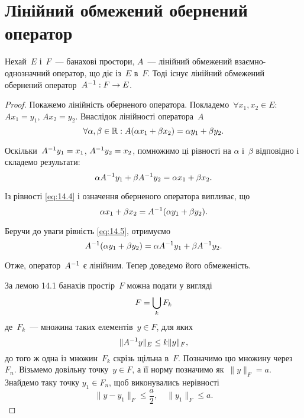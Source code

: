 \section{Лінійний обмежений обернений оператор}

\begin{theorem}
Нехай~$E$ і~$F$~--- банахові простори,
$A$~--- лінійний обмежений взаємно-однозначний оператор,
що діє із~$E$ в~$F$.
Тоді існує лінійний обмежений обернений
оператор~$A^{-1}: F \to E$.
\end{theorem}

\begin{proof}
Покажемо лінійність оберненого оператора.
Покладемо~$\forall x_1, x_2 \in E$: $A x_1 = y_1$, $A x_2 = y_2$.
Внаслідок лінійності оператора~$A$
\begin{equation}
    \label{eq:14.4}
    \forall \alpha, \beta \in \mathbb{R}:
    A(\alpha x_1 + \beta x_2) =
    \alpha y_1 + \beta y_2.
\end{equation}

Оскільки~$A^{-1} y_1 = x_1$, $A^{-1} y_2 = x_2$, помножимо ці рівності на
$\alpha$ і~$\beta$ відповідно і складемо результати:
\begin{equation}
    \label{eq:14.5}
    \alpha A^{-1} y_1 + \beta A^{-1} y_2 =
    \alpha x_1 + \beta x_2.
\end{equation}

Із рівності \eqref{eq:14.4} і означення оберненого оператора випливає, що
\begin{equation*}
    \alpha x_1 + \beta x_2 = A^{-1} (\alpha y_1 + \beta y_2).
\end{equation*}

Беручи до уваги рівність \eqref{eq:14.5}, отримуємо
\begin{equation*}
    A^{-1} (\alpha y_1 + \beta y_2) = \alpha A^{-1} y_1 + \beta A^{-1} y_2.
\end{equation*}

Отже, оператор~$A^{-1}$ є лінійним. Тепер доведемо його обмеженість.

За \error лемою 14.1 банахів простір~$F$ можна подати у вигляді
\begin{equation*}
    F = \operatorname*{\bigcup}_k F_k
\end{equation*}
де~$F_k$~--- множина таких елементів~$y \in F$, для яких
\begin{equation*}
    \|A^{-1} y\|_E \le k \|y\|_F,
\end{equation*}
до того ж одна із множин~$F_k$ скрізь щільна в~$F$. Позначимо
цю множину через~$F_n$. Візьмемо довільну точку~$y \in F$, а її
норму позначимо як~$\|y\|_F = a$. Знайдемо таку точку
$y_1 \in F_n$, щоб виконувались нерівності
\begin{equation*}
    \|y - y_1\|_F \le \frac{a}{2}, \quad \|y_1\|_F \le a.
\end{equation*}


\end{proof}
